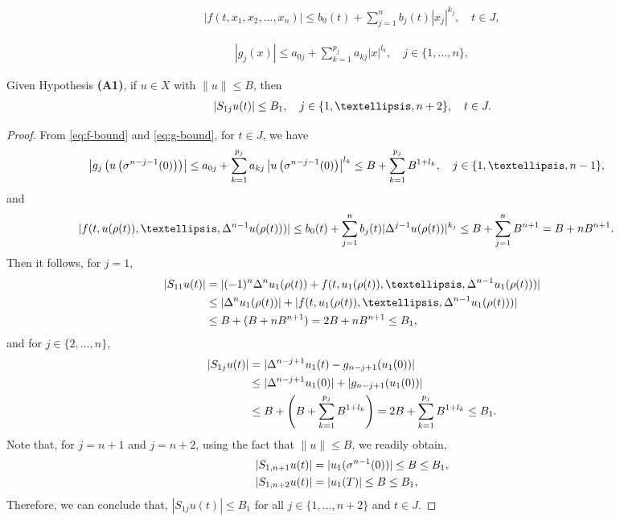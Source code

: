 \documentclass[10pt,a4paper]{amsart}
\begin{document}
\begin{align}
|f(t, x_1, x_2, \ldots, x_n)| \leq b_0(t) + \sum_{j=1}^{n} b_j(t)|x_j|^{k_j}, \quad t \in J, \label{eq:f-bound}
\end{align}

\begin{align}
|g_j(x)| \leq a_{0j} + \sum_{k=1}^{p_j} a_{kj}|x|^{l_k}, \quad j \in \{1, \ldots, n\}, \label{eq:g-bound}
\end{align}

\begin{lemma} \label{lem:S1-bound}
Given Hypothesis {\bf (A1)}, if $u \in X$ with $\|u\| \leq B$, then
\begin{align}
|S_{1j}u(t)| \leq B_1, \quad j \in \{1, \ldots, n+2\}, \quad t \in J. \notag
\end{align}
\end{lemma}

\begin{proof}
From \eqref{eq:f-bound} and \eqref{eq:g-bound}, for $ t \in J$, we have
\begin{align}
\left|g_j\left(u\left(\sigma^{n-j-1}(0)\right)\right)\right| &\leq a_{0j} + \sum_{k=1}^{p_j} a_{kj}\left|u\left(\sigma^{n-j-1}(0)\right)\right|^{l_k} \notag
\leq B + \sum_{k=1}^{p_j} B^{1+l_k}, \quad j \in \{1, \ldots, n-1\}, \notag
\end{align}
and
\begin{align}
|f(t, u(\rho(t)), \ldots, \Delta^{n-1}u(\rho(t)))| &\leq b_0(t) + \sum_{j=1}^{n} b_j(t)|\Delta^{j-1}u(\rho(t))|^{k_j} \notag \leq B + \sum_{j=1}^{n} B^{n+1} = B + nB^{n+1}. \notag
\end{align}
Then it follows, for $j=1$,
\begin{align}
|S_{11}u(t)| &= |(-1)^n\Delta^n u_1(\rho(t)) + f(t, u_1(\rho(t)), \ldots, \Delta^{n-1}u_1(\rho(t)))| \notag\\
&\leq |\Delta^n u_1(\rho(t))| + |f(t, u_1(\rho(t)), \ldots, \Delta^{n-1}u_1(\rho(t)))| \notag\\
&\leq B + (B + nB^{n+1}) = 2B + nB^{n+1} \leq B_1, \notag
\end{align}
and for $j \in \{2, \ldots, n\}$, 
\begin{align}
|S_{1j}u(t)| &= |\Delta^{n-j+1}u_1(t) - g_{n-j+1}(u_1(0))| \notag\\
&\leq |\Delta^{n-j+1}u_1(0)| + |g_{n-j+1}(u_1(0))| \notag\\
&\leq B + \left(B + \sum_{k=1}^{p_j} B^{1+l_k}\right) = 2B + \sum_{k=1}^{p_j} B^{1+l_k} \leq B_1. \notag
\end{align}
Note that, for $j=n+1$ and $j=n+2$, using the fact that $\|u\| \le B$, we readily obtain,
\begin{align}
|S_{1,n+1}u(t)| &= |u_1(\sigma^{n-1}(0))| \leq B \leq B_1, \notag\\
|S_{1,n+2}u(t)| &= |u_1(T)| \leq B \leq B_1, \notag
\end{align}
Therefore, we can conclude that, $|S_{1j}u(t)| \leq B_1$ for all $j \in \{1, \ldots, n+2\}$ and $t \in J$.
\end{proof}
\end{document}
